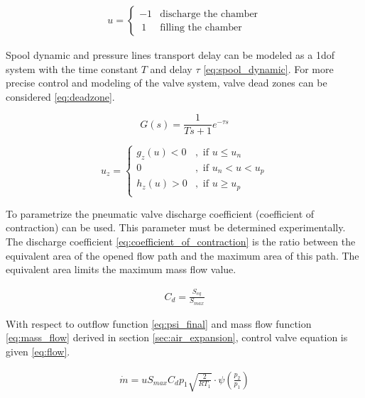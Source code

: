 \begin{align}
    u =
    \begin{cases}
        -1 & \text{discharge the chamber} \\
       \  1  & \text{filling the chamber} 
    \end{cases}
    \label{eq:input_u}
\end{align} 

Spool dynamic and pressure lines transport delay can be modeled as a 1dof
system with the time constant $T$ and delay $\tau$ \ref{eq:spool_dynamic}. For
more precise control and modeling of the valve system, valve dead zones can
be considered \ref{eq:deadzone}.

\begin{equation}
    G(s) = \frac{1}{T s + 1}e^{-\tau s}
    \label{eq:spool_dynamic}
\end{equation}


\begin{equation}
    u_z = 
    \begin{cases}
        g_z(u) < 0 &, \text{ if } u \le u_n \\
        0          &, \text{ if } u_n < u < u_p \\
        h_z(u) > 0 &, \text{ if } u \ge u_p \\
    \end{cases}  
    \label{eq:deadzone}
\end{equation}



To parametrize the pneumatic valve discharge coefficient (coefficient of
contraction) can be used. This parameter must be determined experimentally.
The discharge coefficient \ref{eq:coefficient_of_contraction} is the ratio
between the equivalent area of the opened flow path and the maximum area of
this path. The equivalent area limits the maximum mass flow value. 

\begin{align}
    C_d = \frac{S_{eq}}{S_{max}}
    \label{eq:coefficient_of_contraction}
\end{align}

With respect to outflow function \ref{eq:psi_final} and mass flow function
\ref{eq:mass_flow} derived in section \ref{sec:air_expansion},  control
valve equation is given \ref{eq:flow}.

\begin{align}
    \dot{m} = u S_{max} C_d p_1 \sqrt{\frac{2}{RT_1}}
    \cdot \psi\left(\frac{p_2}{p_1}\right)
    \label{eq:flow}
\end{align}



